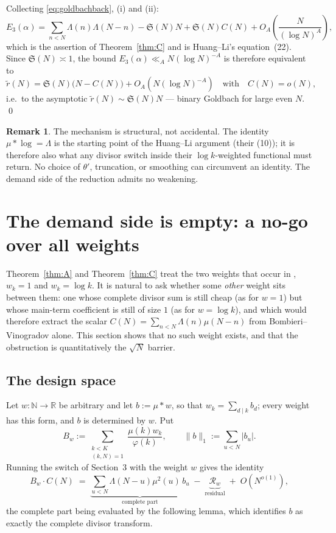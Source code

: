 \documentclass[11pt,a4paper]{article}
\theoremstyle{plain}
\theoremstyle{definition}
\newtheorem{remark}[theorem]{Remark}
\renewcommand{\SS}{\mathfrak{S}}
\begin{document}
Collecting \eqref{eq:goldbachback}, (i) and (ii):
\[
  E_3(\alpha) = \sum_{n<N}\Lambda(n)\Lambda(N-n)
    -\SS(N)N+\SS(N)C(N)+O_A\!\left(\frac{N}{(\log N)^{A}}\right),
\]
which is the assertion of Theorem~\ref{thm:C} and is Huang--Li's
equation~(22). Since $\SS(N)\asymp1$, the bound
$E_3(\alpha)\ll_A N(\log N)^{-A}$ is therefore equivalent to
\[
  \tilde r(N)=\SS(N)\bigl(N-C(N)\bigr)+O_A\!\left(N(\log N)^{-A}\right)
  \quad\text{with}\quad C(N)=o(N),
\]
i.e.\ to the asymptotic $\tilde r(N)\sim\SS(N)N$ --- binary Goldbach for
large even $N$. \qed

\begin{remark}
The mechanism is structural, not accidental. The identity
$\mu*\log=\Lambda$ is the starting point of the Huang--Li argument
(their (10)); it is therefore also what any divisor switch inside their
$\log k$-weighted functional must return. No choice of $\theta'$,
truncation, or smoothing can circumvent an identity. The demand side of
the reduction admits no weakening.
\end{remark}

\section{The demand side is empty: a no-go over all weights}
\label{sec:D}

Theorem~\ref{thm:A} and Theorem~\ref{thm:C} treat the two weights that
occur in \cite{HL}, $w_k = 1$ and $w_k = \log k$. It is natural to ask
whether some \emph{other} weight sits between them: one whose complete
divisor sum is still cheap (as for $w=1$) but whose main-term
coefficient is still of size $1$ (as for $w=\log k$), and which would
therefore extract the scalar $C(N)=\sum_{n<N}\Lambda(n)\mu(N-n)$ from
Bombieri--Vinogradov alone. This section shows that no such weight
exists, and that the obstruction is quantitatively the $\sqrt N$
barrier.

\subsection{The design space}

Let $w:\mathbb N\to\mathbb R$ be arbitrary and let
$b := \mu * w$, so that $w_k=\sum_{d\mid k}b_d$; every weight has this
form, and $b$ is determined by $w$. Put
\[
  B_w := \sum_{\substack{k<K\\(k,N)=1}}\frac{\mu(k)w_k}{\varphi(k)},
  \qquad
  \|b\|_1 := \sum_{u<N}|b_u| .
\]
Running the switch of Section~3 with the weight $w$ gives the identity
\begin{equation}\label{eq:extract}
  B_w\cdot C(N) \;=\; \underbrace{\sum_{u<N}\Lambda(N-u)\mu^2(u)\,b_u}
  _{\text{complete part}} \;-\; \underbrace{\mathcal R_w}_{\text{residual}}
  \;+\;O\!\left(N^{o(1)}\right),
\end{equation}
the complete part being evaluated by the following lemma, which
identifies $b$ as exactly the complete divisor transform.
\end{document}
